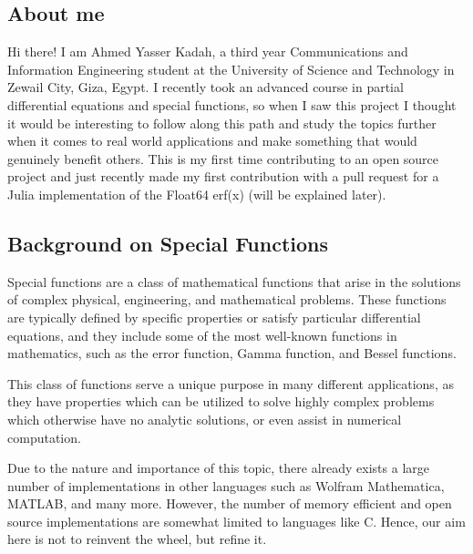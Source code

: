 \documentclass{article}
\theoremstyle{mytheoremstyle}
\theoremstyle{mytheoremstyle}
\theoremstyle{myproblemstyle}
\begin{document}
    \subsection*{About me 
      \href{https://github.com/AhmedYKadah}{\faGithub}    
      \href{https://linkedin.com/in/ahmed-yasser-kadah-83687b269}{\faLinkedin}    
      \href{mailto:ahmadyassermo@gmail.com}{\faEnvelope[regular]}    
    }\label{sub:About} 
      Hi there! I am Ahmed Yasser Kadah, a third year Communications and Information Engineering student at the University of Science and Technology in Zewail City, Giza, Egypt.
      I recently took an advanced course in partial differential equations and special functions, so when I saw this project I thought it would be interesting to follow along this path and study the topics further when it comes to real world applications and make something that would genuinely benefit others. 
      This is my first time contributing to an open source project and just recently made my first contribution with a pull request for a Julia implementation of the Float64 erf(x) (will be explained later). 





    \subsection*{Background on Special Functions}\label{sub:Background } %
   Special functions are a class of mathematical functions that arise in the solutions of complex physical, engineering, and mathematical problems.
   These functions are typically defined by specific properties or satisfy particular differential equations, and they include some of the most well-known functions in mathematics, such as the error function, Gamma function, and Bessel functions.

   This class of functions serve a unique purpose in many different applications, as they have properties which can be utilized to solve highly complex problems which otherwise have no analytic solutions, or even assist in numerical computation.


    Due to the nature and importance of this topic, there already exists a large number of implementations in other languages such as Wolfram Mathematica, MATLAB, and many more.
    However, the number of memory efficient and open source implementations are somewhat limited to languages like C. 
    Hence, our aim here is not to reinvent the wheel, but refine it. 
\end{document}
